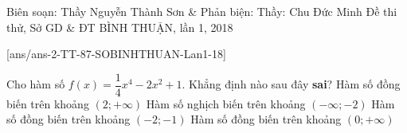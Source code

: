 \begin{name}
{Biên soạn: Thầy Nguyễn Thành Sơn \& Phản biện: Thầy: Chu Đức Minh}
{Đề thi thử, Sở GD \& ĐT BÌNH THUẬN, lần 1, 2018}
\end{name}
\setcounter{ex}{0}\setcounter{bt}{0}
[ans/ans-2-TT-87-SOBINHTHUAN-Lan1-18]
\begin{ex}%
Cho hàm số $f(x)=\dfrac{1}{4}x^4-2x^2+1$. Khẳng định nào sau đây \textbf{sai}?
\choice
{Hàm số đồng biến trên khoảng $(2;+\infty)$}
{Hàm số nghịch biến trên khoảng $(-\infty;-2)$}
{Hàm số đồng biến trên khoảng $(-2;-1)$}
{\True Hàm số đồng biến trên khoảng $(0;+\infty)$}

\end{ex}

